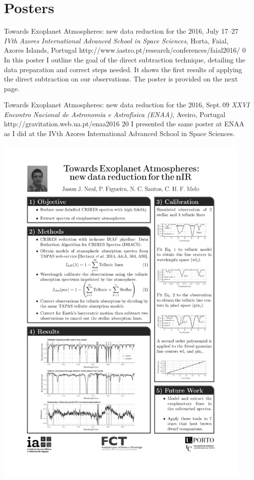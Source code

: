 \section{Posters}\label{appsec:posters}

 {Towards Exoplanet Atmospheres: new data reduction for the \nir{}}%
{2016, July 17--27}%
{\textit{IVth Azores International Advanced School in Space Sciences}, Horta, Faial, Azores Islands, Portugal}%
{http://www.iastro.pt/research/conferences/faial2016/}%
{0}%
{In this poster I outline the goal of the direct subtraction technique, detailing the data preparation and correct steps needed.
    It shows the first results of applying the direct subtraction on our observations.
    The poster is provided on the next page.}%
{}

 {Towards Exoplanet Atmospheres: new data reduction for the \nir{}}%
{2016, Sept.\,09}%
{\textit{XXVI Encontro Nacional de Astronomia e Astrof\'{\i}sica (ENAA)}, Aveiro, Portugal}%
{ http://gravitation.web.ua.pt/enaa2016}%
{20}%
{I presented the same poster at ENAA as I did at the IVth Azores International Advanced School in Space Sciences.}


{\centering{} \includegraphics[width=0.95\textwidth, keepaspectratio=true, page = 1, trim = 1.5cm 1cm 1.5cm 1cm, clip = true]{appendices/papers/Azores2016_grey}}
